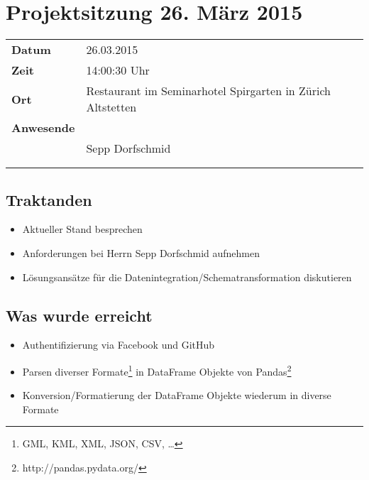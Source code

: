 \documentclass[class=scrbook,crop=false]{standalone}
\begin{document}
	
	\section{Projektsitzung 26. März 2015}
	
	\begin{tabular}{ll}
		\textbf{Datum} & 26.03.2015 \\
		\textbf{Zeit} & 14:00\textendash15:30 Uhr \\
		\textbf{Ort} & Restaurant im Seminarhotel Spirgarten in Zürich Altstetten \\
		\textbf{Anwesende} & \proff \\ & Sepp Dorfschmid\footnotemark{} \\ & \rlif \\ & \fscf
	\end{tabular}
	
	\subsection*{Traktanden}
	\begin{itemize}
		\item Aktueller Stand besprechen
		\item Anforderungen bei Herrn Sepp Dorfschmid aufnehmen
		\item Lösungsansätze für die Datenintegration/Schematransformation diskutieren
	\end{itemize}
	
	\subsection*{Was wurde erreicht}
	\begin{itemize}
		\item Authentifizierung via Facebook und GitHub
		\item Parsen diverser Formate\footnote{GML, KML, XML, JSON, CSV, \dots} in DataFrame Objekte von Pandas\footnote{http://pandas.pydata.org/}
		\item Konversion/Formatierung der DataFrame Objekte wiederum in diverse Formate
	\end{itemize}
	
\end{document}
